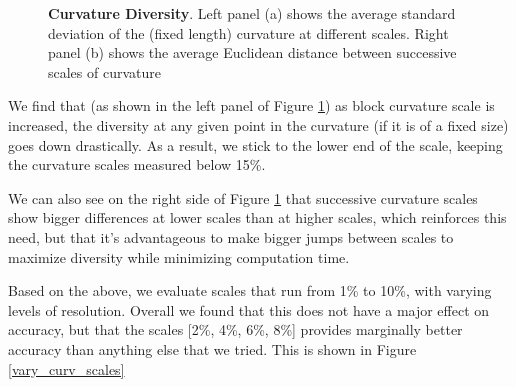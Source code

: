 \begin{figure}[t]%
	\centering
	\caption[]{\textbf{Curvature Diversity}. Left panel (a) shows the average standard deviation of the (fixed length) curvature at different scales. Right panel (b) shows the average Euclidean distance between successive scales of curvature}
    	\label{fig:curvature_diversity}
\end{figure}


We find that (as shown in the left panel of Figure \ref{fig:curvature_diversity}) as block curvature scale is increased, the diversity at any given point in the curvature (if it is of a fixed size) goes down drastically. 
As a result, we stick to the lower end of the scale, keeping the curvature scales measured below 15\%.

We can also see on the right side of Figure \ref{fig:curvature_diversity} that successive curvature scales show bigger differences at lower scales than at higher scales, which reinforces this need, but that it's advantageous to make bigger jumps between scales to maximize diversity while minimizing computation time.

Based on the above, we evaluate scales that run from 1\% to 10\%, with varying levels of resolution.
Overall we found that this does not have a major effect on accuracy, but that the scales [2\%, 4\%, 6\%, 8\%] provides marginally better accuracy than anything else that we tried.
This is shown in Figure \ref{vary_curv_scales}


